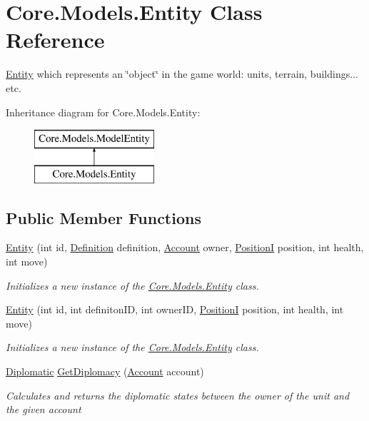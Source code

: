\hypertarget{classCore_1_1Models_1_1Entity}{}\section{Core.\+Models.\+Entity Class Reference}
\label{classCore_1_1Models_1_1Entity}


\hyperlink{classCore_1_1Models_1_1Entity}{Entity} which represents an \char`\"{}object\char`\"{} in the game world\+: units, terrain, buildings... etc.  


Inheritance diagram for Core.\+Models.\+Entity\+:\begin{figure}[H]
\begin{center}
\leavevmode
\includegraphics[height=2.000000cm]{classCore_1_1Models_1_1Entity}
\end{center}
\end{figure}
\subsection*{Public Member Functions}
\begin{DoxyCompactItemize}
\item 
\hyperlink{classCore_1_1Models_1_1Entity_ab4e03f1aca6a491f8fae7777615f1330}{Entity} (int id, \hyperlink{classCore_1_1Models_1_1Definitions_1_1Definition}{Definition} definition, \hyperlink{classCore_1_1Models_1_1Account}{Account} owner, \hyperlink{classCore_1_1Models_1_1PositionI}{Position\+I} position, int health, int move)
\begin{DoxyCompactList}\small\item\em Initializes a new instance of the \hyperlink{classCore_1_1Models_1_1Entity}{Core.\+Models.\+Entity} class. \end{DoxyCompactList}\item 
\hyperlink{classCore_1_1Models_1_1Entity_a53f50c1e8c37885db7ba432562607ccf}{Entity} (int id, int definiton\+I\+D, int owner\+I\+D, \hyperlink{classCore_1_1Models_1_1PositionI}{Position\+I} position, int health, int move)
\begin{DoxyCompactList}\small\item\em Initializes a new instance of the \hyperlink{classCore_1_1Models_1_1Entity}{Core.\+Models.\+Entity} class. \end{DoxyCompactList}\item 
\hyperlink{namespaceCore_1_1Models_ada607f76afbafc59695c90fc5a7093a2}{Diplomatic} \hyperlink{classCore_1_1Models_1_1Entity_aa05984e45fcbf9c35d6bc6cad2b323f5}{Get\+Diplomacy} (\hyperlink{classCore_1_1Models_1_1Account}{Account} account)
\begin{DoxyCompactList}\small\item\em Calculates and returns the diplomatic states between the owner of the unit and the given account \end{DoxyCompactList}\end{DoxyCompactItemize}
